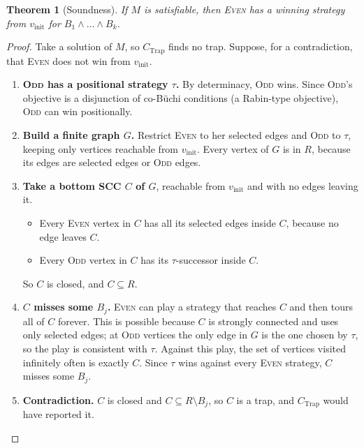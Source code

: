 \documentclass{article}
\newtheorem{theorem}{Theorem}
\theoremstyle{definition}
\theoremstyle{remark}
\newcommand{\Even}{\textsc{Even}}
\newcommand{\Odd}{\textsc{Odd}}
\newcommand{\vinit}{v_{\mathrm{init}}}
\newcommand{\CTrap}{C_{\mathrm{Trap}}}
\begin{document}
\begin{theorem}[Soundness]\label{thm:soundness}
If $M$ is satisfiable, then \Even{} has a winning strategy from $\vinit$ for
$B_1 \wedge \dots \wedge B_k$.
\end{theorem}

\begin{proof}
Take a solution of $M$, so $\CTrap$ finds no trap. Suppose, for a
contradiction, that \Even{} does not win from $\vinit$.

\begin{enumerate}[label=\arabic*.]
  \item \textbf{\Odd{} has a positional strategy $\tau$.} By determinacy,
    \Odd{} wins. Since \Odd{}'s objective is a disjunction of co-B\"uchi
    conditions (a Rabin-type objective), \Odd{} can win positionally.

  \item \textbf{Build a finite graph $G$.} Restrict \Even{} to her selected
    edges and \Odd{} to $\tau$, keeping only vertices reachable from $\vinit$.
    Every vertex of $G$ is in $R$, because its edges are selected edges or
    \Odd{} edges.

  \item \textbf{Take a bottom SCC $C$ of $G$}, reachable from $\vinit$ and with
    no edges leaving it.
    \begin{itemize}
      \item Every \Even{} vertex in $C$ has all its selected edges inside $C$,
        because no edge leaves $C$.
      \item Every \Odd{} vertex in $C$ has its $\tau$-successor inside $C$.
    \end{itemize}
    So $C$ is closed, and $C \subseteq R$.

  \item \textbf{$C$ misses some $B_j$.} \Even{} can play a strategy that
    reaches $C$ and then tours all of $C$ forever. This is possible because
    $C$ is strongly connected and uses only selected edges; at \Odd{}
    vertices the only edge in $G$ is the one chosen by $\tau$, so the play is
    consistent with $\tau$. Against this play, the set of vertices visited
    infinitely often is exactly $C$. Since $\tau$ wins against every \Even{}
    strategy, $C$ misses some $B_j$.

  \item \textbf{Contradiction.} $C$ is closed and
    $C \subseteq R \setminus B_j$, so $C$ is a trap, and $\CTrap$ would have
    reported it. \qedhere
\end{enumerate}
\end{proof}
\end{document}
